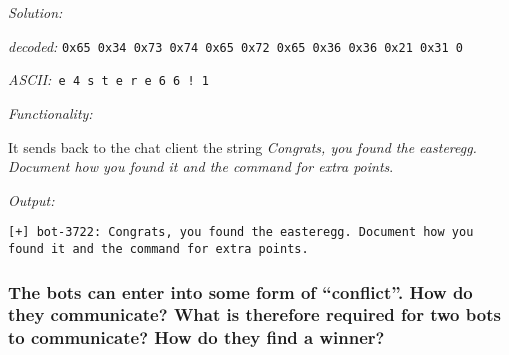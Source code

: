 \documentclass[a4paper,11pt]{article}
\newenvironment{solution}%
{\par{\noindent\small\textit{Solution:}}\vspace{-12pt}\begin{framed}}%
{\end{framed}\par}
\begin{document}
\begin{solution}
\begin{itemize}
   \emph{decoded:} \texttt{0x65  0x34  0x73  0x74  0x65  0x72  0x65  0x36  0x36  0x21  0x31   0}

   
   \emph{ASCII:}\texttt{ e     4     s     t     e     r    e     6      6    !     1}


\emph{Functionality:}

It sends back to the chat client the string \emph{Congrats, you found the easteregg. Document how you found it and the command for extra points}.

\emph{Output:}

\verb|[+] bot-3722: Congrats, you found the easteregg. Document how you found it and the command for extra points.|

\end{itemize}
\end{solution}\fi

\subsubsection*{The bots can enter into some form of ``conflict''. How do they
communicate? What is therefore required for two bots to communicate? How do they
find a winner?}
\end{document}
